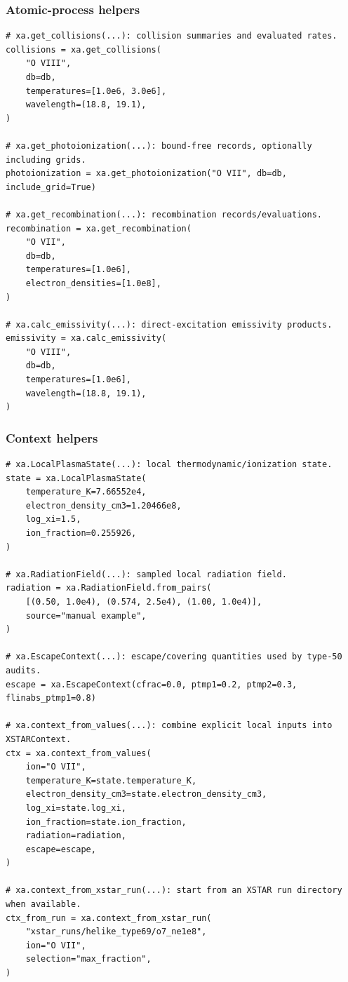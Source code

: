 \documentclass[11pt]{article}
\begin{document}
\subsubsection{Atomic-process helpers}

\begin{lstlisting}[style=ctpython]
# xa.get_collisions(...): collision summaries and evaluated rates.
collisions = xa.get_collisions(
    "O VIII",
    db=db,
    temperatures=[1.0e6, 3.0e6],
    wavelength=(18.8, 19.1),
)

# xa.get_photoionization(...): bound-free records, optionally including grids.
photoionization = xa.get_photoionization("O VII", db=db, include_grid=True)

# xa.get_recombination(...): recombination records/evaluations.
recombination = xa.get_recombination(
    "O VII",
    db=db,
    temperatures=[1.0e6],
    electron_densities=[1.0e8],
)

# xa.calc_emissivity(...): direct-excitation emissivity products.
emissivity = xa.calc_emissivity(
    "O VIII",
    db=db,
    temperatures=[1.0e6],
    wavelength=(18.8, 19.1),
)
\end{lstlisting}

\subsubsection{Context helpers}

\begin{lstlisting}[style=ctpython]
# xa.LocalPlasmaState(...): local thermodynamic/ionization state.
state = xa.LocalPlasmaState(
    temperature_K=7.66552e4,
    electron_density_cm3=1.20466e8,
    log_xi=1.5,
    ion_fraction=0.255926,
)

# xa.RadiationField(...): sampled local radiation field.
radiation = xa.RadiationField.from_pairs(
    [(0.50, 1.0e4), (0.574, 2.5e4), (1.00, 1.0e4)],
    source="manual example",
)

# xa.EscapeContext(...): escape/covering quantities used by type-50 audits.
escape = xa.EscapeContext(cfrac=0.0, ptmp1=0.2, ptmp2=0.3, flinabs_ptmp1=0.8)

# xa.context_from_values(...): combine explicit local inputs into XSTARContext.
ctx = xa.context_from_values(
    ion="O VII",
    temperature_K=state.temperature_K,
    electron_density_cm3=state.electron_density_cm3,
    log_xi=state.log_xi,
    ion_fraction=state.ion_fraction,
    radiation=radiation,
    escape=escape,
)

# xa.context_from_xstar_run(...): start from an XSTAR run directory when available.
ctx_from_run = xa.context_from_xstar_run(
    "xstar_runs/helike_type69/o7_ne1e8",
    ion="O VII",
    selection="max_fraction",
)
\end{lstlisting}
\end{document}

